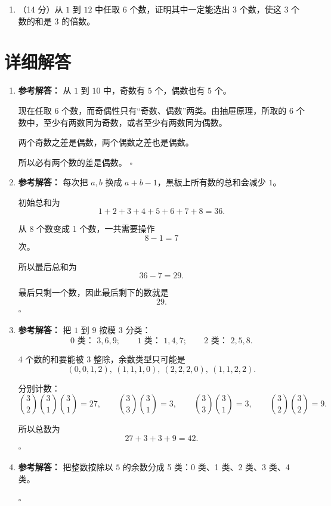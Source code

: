 \documentclass[11pt,a4paper,fontset=fandol]{ctexart}
\newenvironment{solution}{\par\noindent\textbf{参考解答：}}{\hfill$\square$\par}
\newcommand{\biganswerspace}{\vspace{3.1cm}}
\begin{document}
\begin{enumerate}
  \item （14 分）从 $1$ 到 $12$ 中任取 $6$ 个数，证明其中一定能选出 $3$ 个数，使这 $3$ 个数的和是 $3$ 的倍数。
  \biganswerspace
\end{enumerate}

\newpage
\section{详细解答}

\begin{enumerate}
  \item \begin{solution}
  从 $1$ 到 $10$ 中，奇数有 $5$ 个，偶数也有 $5$ 个。

  现在任取 $6$ 个数，而奇偶性只有“奇数、偶数”两类。由抽屉原理，所取的 $6$ 个数中，至少有两数同为奇数，或者至少有两数同为偶数。

  两个奇数之差是偶数，两个偶数之差也是偶数。

  所以必有两个数的差是偶数。
  \end{solution}

  \item \begin{solution}
  每次把 $a,b$ 换成 $a+b-1$，黑板上所有数的总和会减少 $1$。

  初始总和为
  \[
  1+2+3+4+5+6+7+8=36.
  \]

  从 8 个数变成 1 个数，一共需要操作
  \[
  8-1=7
  \]
  次。

  所以最后总和为
  \[
  36-7=29.
  \]

  最后只剩一个数，因此最后剩下的数就是
  \[
  29.
  \]
  \end{solution}

  \item \begin{solution}
  把 $1$ 到 $9$ 按模 $3$ 分类：
  \[
  0\text{ 类： }3,6,9;\qquad 1\text{ 类： }1,4,7;\qquad 2\text{ 类： }2,5,8.
  \]

  4 个数的和要能被 $3$ 整除，余数类型只可能是
  \[
  (0,0,1,2),\ (1,1,1,0),\ (2,2,2,0),\ (1,1,2,2).
  \]

  分别计数：
  \[
  \binom32\binom31\binom31=27,
  \qquad
  \binom33\binom31=3,
  \qquad
  \binom33\binom31=3,
  \qquad
  \binom32\binom32=9.
  \]

  所以总数为
  \[
  27+3+3+9=42.
  \]
  \end{solution}

  \item \begin{solution}
  把整数按除以 $5$ 的余数分成 5 类：0 类、1 类、2 类、3 类、4 类。


\end{solution}
\end{enumerate}
\end{document}

